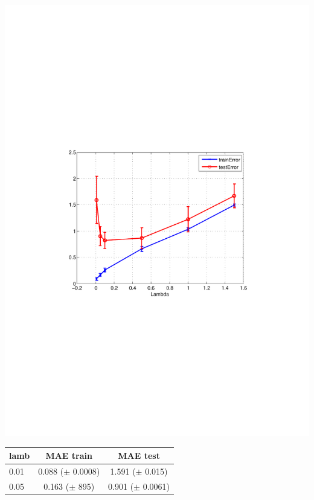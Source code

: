 \begin{minipage}{\textwidth}
  \begin{minipage}[b]{0.45\textwidth}
    \centering
    \includegraphics[clip, trim=4cm 9.2cm 3.5cm 9cm, width=\textwidth]{figures/ALS_lambda.pdf}
    \label{fig:ALS_lambdas}
  \end{minipage}
  \hfill
  \begin{minipage}[b]{0.5\textwidth}
  \begin{center}
  \begin{tabular}{ |l | c | c| }
    \hline
     lamb & MAE train & MAE test \\ \hline
     0.01   & 0.088 ($\pm$  0.0008) &  1.591 ($\pm$ 0.015) \\ \hline
     0.05  &  0.163 ($\pm$  895) &  0.901 ($\pm$  0.0061) \\ \hline

\end{tabular}
\end{center}
\end{minipage}
\end{minipage}
